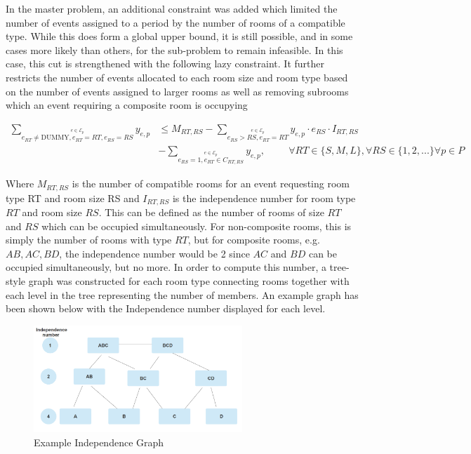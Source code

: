 \documentclass{article}
\newcommand{\E}{\mathcal{E}}
\begin{document}
In the master problem, an additional constraint was added which limited the number of events assigned to a period by the number of rooms of a compatible type. While this does form a global upper bound, it is still possible, and in some cases more likely than others, for the sub-problem to remain infeasible. In this case, this cut is strengthened with the following lazy constraint. It further restricts the number of events allocated to each room size and room type based on the number of events assigned to larger rooms as well as removing subrooms which an event requiring a composite room is occupying

\begin{align}
    \sum_{\stackrel{e\in\E_p}{e_{RT} \neq \text{DUMMY}, e_{RT} = RT, e_{RS} = RS}} y_{e, p} &\le M_{RT, RS} - \sum_{\stackrel{e\in\E_p}{e_{RS} > RS, e_{RT} = RT}} y_{e,p} \cdot e_{RS} \cdot I_{RT, RS} \nonumber \\
    & - \sum_{\stackrel{e\in\E_p}{e_{RS} = 1, e_{RT} \in C_{RT, RS}}} y_{e,p}, \hspace{1cm} \forall RT \in \{S, M, L\}, \forall RS \in \{1,2,...\} \forall p\in P
\end{align}

Where $M_{RT, RS}$ is the number of compatible rooms for an event requesting room type RT and room size RS and $I_{RT, RS}$ is the independence number for room type $RT$ and room size $RS$. This can be defined as the number of rooms of size $RT$ and $RS$ which can be occupied simultaneously. For non-composite rooms, this is simply the number of rooms with type $RT$, but for composite rooms, e.g. $AB, AC, BD$, the independence number would be 2 since $AC$ and $BD$ can be occupied simultaneously, but no more. In order to compute this number, a tree-style graph was constructed for each room type connecting rooms together with each level in the tree representing the number of members. An example graph has been shown below with the Independence number displayed for each level.

\begin{figure}[htb]
    \centering
    \includegraphics[width=0.7\textwidth]{Images/independence_graph.png}
    \caption{Example Independence Graph}
    \label{fig:exp_indp_graph}
\end{figure}
\end{document}
